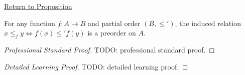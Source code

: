 \newpage
{}
\label{prf:induced-preorder}

\begin{remark*}[Return]
\hyperref[prop:induced-preorder]{Return to Proposition}
\end{remark*}

\begin{proposition*}
For any function $f : A \to B$ and partial order $(B,\leq')$, the induced
relation $x \leq_f y \Longleftrightarrow f(x)\leq' f(y)$ is a preorder on $A$.
\end{proposition*}

\begin{proof}[Professional Standard Proof]
\LRAProofBodyStart
TODO: professional standard proof.
\end{proof}

\begin{proof}[Detailed Learning Proof]
\LRAProofBodyStart
TODO: detailed learning proof.
\end{proof}

\begin{remark*}
\end{remark*}

\begin{dependencies}
\NoLocalDependencies
\end{dependencies}

\clearpage
